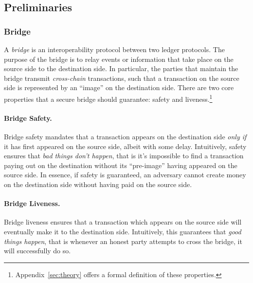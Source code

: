 \subsection{Preliminaries}

\subsubsection{Bridge}
A \emph{bridge} is an interoperability protocol between two ledger protocols.
The purpose of the bridge is to relay events or information that take place on
the source side to the destination side\cite{sok_bridges, Zamyatin2019SoKCA}. In particular, the parties that
maintain the bridge transmit \emph{cross-chain} transactions, such that a
transaction on the source side is represented by an ``image'' on the
destination side. There are two core properties that a secure bridge should 
guarantee: safety and liveness.\footnote{Appendix~\ref{sec:theory} offers a formal definition of these properties.}

\paragraph{Bridge Safety.}
Bridge safety mandates that a transaction appears on the destination side \emph{only if} it has first
appeared on the source side, albeit with some delay.
%
Intuitively, safety ensures that \emph{bad
things don't happen}, that is it's impossible to find a transaction paying out on the
destination without its ``pre-image'' having appeared on the source side. 
In essence, if safety is guaranteed, an adversary cannot create money on the
destination side without having paid on the source side.
%

\paragraph{Bridge Liveness.}
Bridge liveness ensures that a transaction which appears on the source side will eventually make
it to the destination side. Intuitively, this guarantees that \emph{good things happen}, that is whenever an
honest party attempts to cross the bridge, it will successfully do so.

